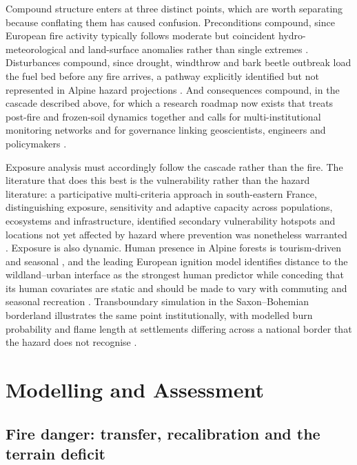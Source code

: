 \documentclass[11pt,a4paper]{article}
\begin{document}
Compound structure enters at three distinct points, which are worth separating because conflating them has caused confusion. Preconditions compound, since European fire activity typically follows moderate but coincident hydro-meteorological and land-surface anomalies rather than single extremes \citep{miller_compounding_2025}. Disturbances compound, since drought, windthrow and bark beetle outbreak load the fuel bed before any fire arrives, a pathway explicitly identified but not represented in Alpine hazard projections \citep{gerberding_mapping_2025, bebi_changes_2017}. And consequences compound, in the cascade described above, for which a research roadmap now exists that treats post-fire and frozen-soil dynamics together and calls for multi-institutional monitoring networks and for governance linking geoscientists, engineers and policymakers \citep{baselt_compound_2026}.

Exposure analysis must accordingly follow the cascade rather than the fire. The literature that does this best is the vulnerability rather than the hazard literature: a participative multi-criteria approach in south-eastern France, distinguishing exposure, sensitivity and adaptive capacity across populations, ecosystems and infrastructure, identified secondary vulnerability hotspots and locations not yet affected by hazard where prevention was nonetheless warranted \citep{riviere_mapping_2023}. Exposure is also dynamic. Human presence in Alpine forests is tourism-driven and seasonal \citep{pede_mountain_2022, abrham_wildfires_2024}, and the leading European ignition model identifies distance to the wildland--urban interface as the strongest human predictor while conceding that its human covariates are static and should be made to vary with commuting and seasonal recreation \citep{gelabert_assessing_2025}. Transboundary simulation in the Saxon--Bohemian borderland illustrates the same point institutionally, with modelled burn probability and flame length at settlements differing across a national border that the hazard does not recognise \citep{avouris_exposure_2025}.


\section{Modelling and Assessment}
\label{sec:modelling}

\subsection{Fire danger: transfer, recalibration and the terrain deficit}
\end{document}
